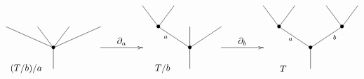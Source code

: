 \documentclass[11pt,a4paper,openright,oneside]{article}
\numberwithin{equation}{section}
\theoremstyle{definition}
\begin{document}
\begin{equation}
    \xy
    <0.08cm, 0cm>:
    (0.0, 0.0)*{}="1"; %
    (0.0, 10.0)*=0{\bullet}="2"; %
    (-22.5, 20.0)*{}="3"; %
    (-7.5, 20.0)*{}="4"; %
    (7.5, 20.0)*{}="5"; %
    (22.5, 20.0)*{}="6"; %
    "1";"2" **\dir{-};
    "2";"3" **\dir{-};
    "2";"4" **\dir{-};
    "2";"5" **\dir{-};
    "2";"6" **\dir{-};
    (-13,0)*{(T/b)/a};
    \endxy
    \xy
    <0.08cm, 0cm>:
    (-10, 0.0)*{}="1";
    (10, 0.0)*{}="2";
    (10, 10)*{}="3";
    (-10, 0)*{}="4";
    {\ar(-10, 10)*{};(10,10)*{}};
    (0,13)*{\partial_a};
    \endxy
    \xy
    <0.08cm, 0cm>:
    (0.0, 0.0)*{}="1"; %
    (0.0, 10.0)*=0{\bullet}="2"; %
    (-15.0, 20.0)*=0{\bullet}="3"; %
    (-22.5, 30.0)*{}="4"; %
    (-7.5, 30.0)*{}="5"; %
    (0.0, 20.0)*{}="6"; %
    (15.0, 20.0)*{}="7"; %
    "1";"2" **\dir{-};
    "2";"3" **\dir{-};
    "3";"4" **\dir{-};
    "3";"5" **\dir{-};
    "2";"6" **\dir{-};
    "2";"7" **\dir{-};
    (-11.5, 15.0)*=0{\scriptstyle a};
    (-13,0)*{T/b};
    \endxy
    \xy
    <0.08cm, 0cm>:
    (-10, 0.0)*{}="1";
    (10, 0.0)*{}="2";
    (10, 10)*{}="3";
    (-10, 0)*{}="4";
    {\ar(-10, 10)*{};(10,10)*{}};
    (0,13)*{\partial_b};
    \endxy
    \xy
    <0.08cm, 0cm>:
    (0.0, 0.0)*{}="1"; %
    (0.0, 10.0)*=0{\bullet}="2"; %
    (-15.0, 20.0)*=0{\bullet}="3"; %
    (-22.5, 30.0)*{}="4"; %
    (-7.5, 30.0)*{}="5"; %
    (15.0, 20.0)*=0{\bullet}="6"; %
    (7.5, 30.0)*{}="7"; %
    (22.5, 30.0)*{}="8"; %
    "1";"2" **\dir{-};
    "2";"3" **\dir{-};
    "3";"4" **\dir{-};
    "3";"5" **\dir{-};
    "2";"6" **\dir{-};
    "6";"7" **\dir{-};
    "6";"8" **\dir{-};
    (-9.5, 14.0)*=0{\scriptstyle a};
    (11.5, 15.0)*=0{\scriptstyle b};
    (-13,0)*{T};
    \endxy
\end{equation}
\end{document}
